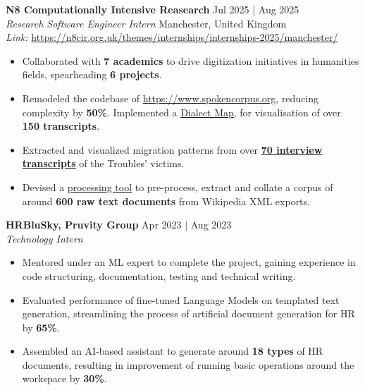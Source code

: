 \documentclass[a4paper,1.5pt]{extarticle}
\begin{document}
\textbf{N8 Computationally Intensive Reasearch} \hfill Jul 2025 | Aug 2025 \\ 
\textit{Research Software Engineer Intern} \hfill Manchester, United Kingdom \\ %
\textit{Link:} \url{https://n8cir.org.uk/themes/internships/internships-2025/manchester/}
\begin{itemize}
    \item Collaborated with \textbf{7 academics} to drive digitization initiatives in humanities fields, spearheading \textbf{6 projects}.
    \item Remodeled the codebase of \url{https://www.spokencorpus.org}, reducing complexity by \textbf{50\%}. Implemented a \href{https://spokencorpus.org/map_search.php}{Dialect Map}, for visualisation of over \textbf{150 transcripts}.
    \item Extracted and visualized migration patterns from over \href{https://conflictmemorymigration.manchester.ac.uk/interviews/}{\textbf{70 interview transcripts}} of the Troubles' victims. 
    \item Devised a \href{https://github.com/manojmanikandan7/WikipediaXmlParser}{processing tool} to pre-process, extract and collate a corpus of around \textbf{600 raw text documents} from Wikipedia XML exports. 
\end{itemize}
\textbf{HRBluSky, Pruvity Group} \hfill Apr 2023 | Aug 2023 \\ %
\textit{Technology Intern}  %
\begin{itemize}
    \item Mentored under an ML expert to complete the project, gaining experience in code structuring, documentation, testing and technical writing.
    \item Evaluated performance of fine-tuned Language Models on templated text generation, streamlining the process of artificial document generation for HR by \textbf{65\%}.
    \item Assembled an AI-based assistant to generate around \textbf{18 types} of HR documents, resulting in improvement of running basic operations around the workspace by \textbf{30\%}.
\end{itemize}


\end{document}

